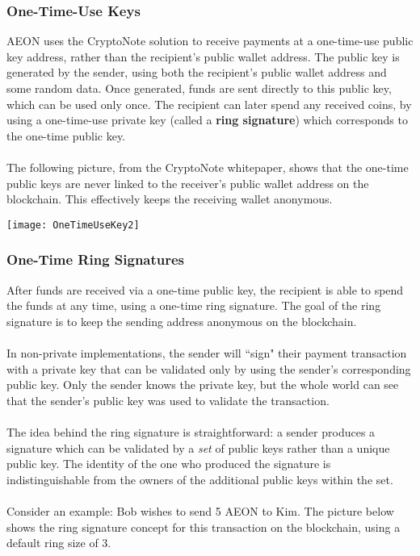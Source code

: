 \subsubsection{One-Time-Use Keys}
AEON uses the CryptoNote solution to receive payments at a one-time-use public key address, rather than the recipient's public wallet address.  The public key is generated by the sender, using both the recipient's public wallet address and some random data.  Once generated, funds are sent directly to this public key, which can be used only once.  The recipient can later spend any received coins, by using a one-time-use private key (called a \textbf{ring signature}) which corresponds to the one-time public key.\\
\\
The following picture, from the CryptoNote whitepaper, shows that the one-time public keys are never linked to the receiver's public wallet address on the blockchain.  This effectively keeps the receiving wallet anonymous.\\

\begin{center}
	\texttt{[image: OneTimeUseKey2]}
\end{center}

\subsubsection{One-Time Ring Signatures}
After funds are received via a one-time public key, the recipient is able to spend the funds at any time, using a one-time ring signature.  The goal of the ring signature is to keep the sending address anonymous on the blockchain.\\
\\
In non-private implementations, the sender will “sign" their payment transaction with a private key that can be validated only by using the sender's corresponding public key.  Only the sender knows the private key, but the whole world can see that the sender's public key was used to validate the transaction.\\
\\
The idea behind the ring signature is straightforward:  a sender produces a signature which can be validated by a \textit{set} of public keys rather than a unique public key.  The identity of the one who produced the signature is indistinguishable from the owners of the additional public keys within the set.\\
\\
Consider an example:  Bob wishes to send 5 AEON to Kim.  The picture below shows the ring signature concept for this transaction on the blockchain, using a default ring size of 3.\\

